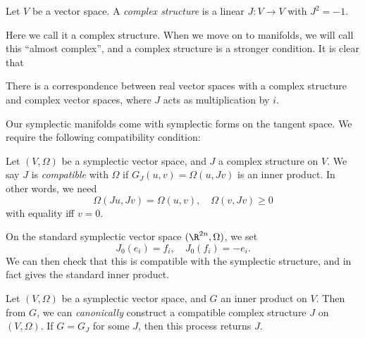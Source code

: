 \documentclass[a4paper]{article}
\begin{document}
\begin{defi}
  Let $V$ be a vector space. A \emph{complex structure} is a linear $J: V \to V$ with $J^2 = -1$.
\end{defi}
Here we call it a complex structure. When we move on to manifolds, we will call this ``almost complex'', and a complex structure is a stronger condition. It is clear that

\begin{lemma}
  There is a correspondence between real vector spaces with a complex structure and complex vector spaces, where $J$ acts as multiplication by $i$.\fakeqed
\end{lemma}

Our symplectic manifolds come with symplectic forms on the tangent space. We require the following compatibility condition:

\begin{defi}
  Let $(V, \Omega)$ be a symplectic vector space, and $J$ a complex structure on $V$. We say $J$ is \emph{compatible} with $\Omega$ if $G_J(u, v) = \Omega(u, Jv)$ is an inner product. In other words, we need
  \[
    \Omega(Ju, Jv) = \Omega(u, v),\quad \Omega(v, Jv) \geq 0
  \]
  with equality iff $v = 0$.
\end{defi}

\begin{eg}
  On the standard symplectic vector space $(\R^{2n}, \Omega)$, we set
  \[
    J_0(e_i) = f_i,\quad J_0(f_i) = - e_i.
  \]
  We can then check that this is compatible with the symplectic structure, and in fact gives the standard inner product.
\end{eg}

\begin{prop}
  Let $(V, \Omega)$ be a symplectic vector space, and $G$ an inner product on $V$. Then from $G$, we can \emph{canonically} construct a compatible complex structure $J$ on $(V, \Omega)$. If $G = G_{J}$ for some $J$, then this process returns $J$.
\end{prop}
\end{document}

